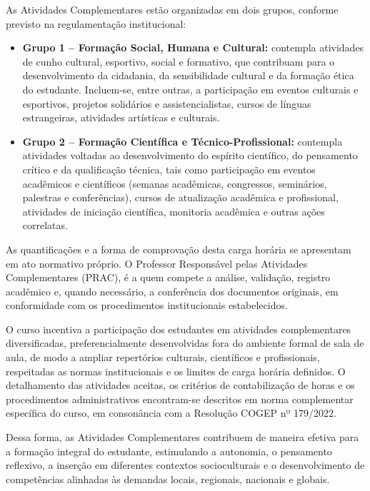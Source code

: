 As Atividades Complementares estão organizadas em dois grupos, conforme previsto na regulamentação institucional:

\begin{itemize}
    \item \textbf{Grupo 1 – Formação Social, Humana e Cultural:} contempla atividades de cunho cultural, esportivo, social e formativo, que contribuam para o desenvolvimento da cidadania, da sensibilidade cultural e da formação ética do estudante. Incluem-se, entre outras, a participação em eventos culturais e esportivos, projetos solidários e assistencialistas, cursos de línguas estrangeiras, atividades artísticas e culturais.
    \item \textbf{Grupo 2 – Formação Científica e Técnico-Profissional:} contempla atividades voltadas ao desenvolvimento do espírito científico, do pensamento crítico e da qualificação técnica, tais como participação em eventos acadêmicos e científicos (semanas acadêmicas, congressos, seminários, palestras e conferências), cursos de atualização acadêmica e profissional, atividades de iniciação científica, monitoria acadêmica e outras ações correlatas.
\end{itemize}

As quantificações e a forma de comprovação desta carga horária se apresentam em ato normativo próprio. O Professor Responsável pelas Atividades Complementares (PRAC), é a quem compete a análise, validação, registro acadêmico e, quando necessário, a conferência dos documentos originais, em conformidade com os procedimentos institucionais estabelecidos.

O curso incentiva a participação dos estudantes em atividades complementares diversificadas, preferencialmente desenvolvidas fora do ambiente formal de sala de aula, de modo a ampliar repertórios culturais, científicos e profissionais, respeitadas as normas institucionais e os limites de carga horária definidos. O detalhamento das atividades aceitas, os critérios de contabilização de horas e os procedimentos administrativos encontram-se descritos em norma complementar específica do curso, em consonância com a Resolução COGEP nº 179/2022.

Dessa forma, as Atividades Complementares contribuem de maneira efetiva para a formação integral do estudante, estimulando a autonomia, o pensamento reflexivo, a inserção em diferentes contextos socioculturais e o desenvolvimento de competências alinhadas às demandas locais, regionais, nacionais e globais.

